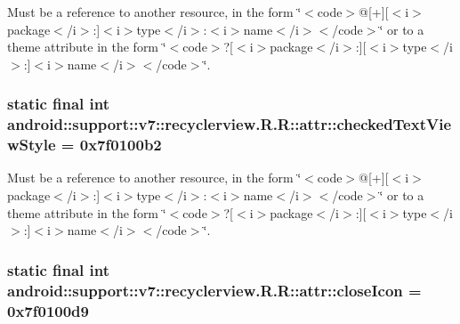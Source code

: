 Must be a reference to another resource, in the form \char`\"{}$<$code$>$@\mbox{[}+\mbox{]}\mbox{[}$<$i$>$package$<$/i$>$:\mbox{]}$<$i$>$type$<$/i$>$:$<$i$>$name$<$/i$>$$<$/code$>$\char`\"{} or to a theme attribute in the form \char`\"{}$<$code$>$?\mbox{[}$<$i$>$package$<$/i$>$:\mbox{]}\mbox{[}$<$i$>$type$<$/i$>$:\mbox{]}$<$i$>$name$<$/i$>$$<$/code$>$\char`\"{}. \hypertarget{classandroid_1_1support_1_1v7_1_1recyclerview_1_1_r_1_1attr_eb907da274e1f14968160ded42673701}{
\subsubsection[{checkedTextViewStyle}]{\setlength{\rightskip}{0pt plus 5cm}static final int android::support::v7::recyclerview.R.R::attr::checkedTextViewStyle = 0x7f0100b2}}
\label{classandroid_1_1support_1_1v7_1_1recyclerview_1_1_r_1_1attr_eb907da274e1f14968160ded42673701}


Must be a reference to another resource, in the form \char`\"{}$<$code$>$@\mbox{[}+\mbox{]}\mbox{[}$<$i$>$package$<$/i$>$:\mbox{]}$<$i$>$type$<$/i$>$:$<$i$>$name$<$/i$>$$<$/code$>$\char`\"{} or to a theme attribute in the form \char`\"{}$<$code$>$?\mbox{[}$<$i$>$package$<$/i$>$:\mbox{]}\mbox{[}$<$i$>$type$<$/i$>$:\mbox{]}$<$i$>$name$<$/i$>$$<$/code$>$\char`\"{}. \hypertarget{classandroid_1_1support_1_1v7_1_1recyclerview_1_1_r_1_1attr_17b9db8ab6c738174e60ac34c9f05fde}{
\subsubsection[{closeIcon}]{\setlength{\rightskip}{0pt plus 5cm}static final int android::support::v7::recyclerview.R.R::attr::closeIcon = 0x7f0100d9}}
\label{classandroid_1_1support_1_1v7_1_1recyclerview_1_1_r_1_1attr_17b9db8ab6c738174e60ac34c9f05fde}


